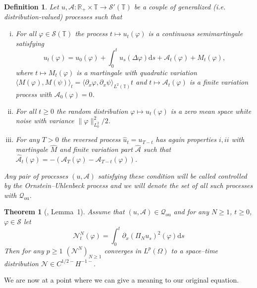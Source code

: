 \documentclass[a4paper,11pt]{article}
\newcommand{\mathd}{\mathrm{d}}
\newcommand{\tmop}[1]{\ensuremath{\operatorname{#1}}}
\newcommand{\tmtextit}[1]{{\itshape{#1}}}
\newenvironment{enumerateroman}{\begin{enumerate}[i.] }{\end{enumerate}}
\newtheorem{definition}{Definition}
{\theorembodyfont{\rmfamily}\newtheorem{example}{Example}}
{\theorembodyfont{\rmfamily\small\it}\newtheorem{exercise}{Exercise}}
\newtheorem{theorem}{Theorem}
\newcommand{\CS}{\mathscr{S}}
\begin{document}
\begin{definition}
  Let $u, \mathcal{A}: \mathbb{R}_+ \times \mathbb{T} \rightarrow
  \CS'(\mathbb{T})$ be a couple of generalized (i.e. distribution-valued) processes such that
  \begin{enumerateroman}
    \item For all $\varphi \in \CS (\mathbb{T})$ the process $t \mapsto u_t
    (\varphi)$ is a continuous semimartingale satisfying
    \[ u_t (\varphi) = u_0 (\varphi) + \int_0^t u_s (\Delta \varphi) \mathd s
       +\mathcal{A}_t (\varphi) + M_t (\varphi), \]
    where $t \mapsto M_t (\varphi)$ is a martingale with quadratic variation
    $\langle M (\varphi), M (\psi) \rangle_t = \langle \partial_x \varphi,
    \partial_x \psi \rangle_{L^2 (\mathbb{T})} t$ and $t \mapsto \mathcal{A}_t
    (\varphi)$ is a finite variation process with $\mathcal{A}_0(\varphi) = 0$.
    
    \item For all $t \geqslant 0$ the random distribution $\varphi \mapsto u_t
    (\varphi)$ is a zero mean space white noise with variance $\| \varphi
    \|_{L^2_0}^2 / 2$.
    
    \item For any $T > 0$ the reversed process $\hat{u}_t = u_{T - t}$ has
    again properties $i, i i$ with martingale $\hat{M}$ and finite variation
    part $\hat{\mathcal{A}}$ such that $\hat{\mathcal{A}}_t (\varphi) = -
    (\mathcal{A}_T (\varphi) -\mathcal{A}_{T - t} (\varphi))$.
  \end{enumerateroman}
  Any pair of processes $(u, \mathcal{A})$ satisfying these condition will be
  called \tmtextit{controlled by the Ornstein--Uhlenbeck process} and we will
  denote the set of all such processes with $\mathcal{Q}_{\tmop{ou}}$.
\end{definition}

\begin{theorem}[\cite{gubinelli_regularization_2013}, Lemma~1]
  Assume that $(u, \mathcal{A}) \in \mathcal{Q}_{\tmop{ou}}$ and for any $N
  \geqslant 1$, $t \geqslant 0$, $\varphi \in \CS$ let
  \[ \mathcal{N}_t^N (\varphi) = \int_0^t \partial_x (\Pi_N u_s)^2 (\varphi)
     \mathd s \]
  Then for any $p \geqslant 1$ $(\mathcal{N}^N)_{N \geqslant 1}$ converges in
  $L^p(\Omega)$ to a space--time distribution $\mathcal{N} \in C^{1 / 2 -} H^{-
  1 -}$.
\end{theorem}

We are now at a point where we can give a meaning to our original equation.
\end{document}
